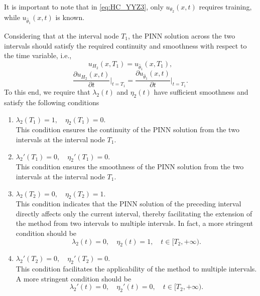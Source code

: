 \documentclass[preprint]{elsarticle}
\numberwithin{table}{section}
\numberwithin{equation}{section}
\numberwithin{figure}{section}
\begin{document}
\begin{CJK}{UTF8}{gbsn}
It is important to note that in \eqref{eq:HC_YYZ3}, only   $u_{\theta_2}(x,t)$ requires training, while $u_{\hat\theta_1}(x,t)$ is  known.

 
 
 Considering that at the interval node $T_1$,   the PINN solution across the two intervals  should satisfy the required continuity and smoothness with respect to the time variable, i.e.,
\begin{equation}\label{continus}
{u}_{H_2}(x,T_1) = {u}_{\hat\theta_1}(x,T_1),
\end{equation}
\begin{equation}\label{d_continus}
\frac{\partial u_{H_2}(x,t)}{\partial t} \bigg|_{t=T_1} = \frac{\partial u_{\hat\theta_1}(x,t)}{\partial t} \bigg|_{t=T_1}.
\end{equation}
To this end, we require that $\lambda_2(t)$ and $\eta_2(t)$ have sufficient smoothness and satisfy the following conditions 
\begin{enumerate}
    \item $\lambda_2(T_1)=1,\quad\eta_2(T_1) =0.$\\
    This condition ensures    the continuity of the PINN solution from the two intervals at the interval node   $T_1$.
 
    \item $\lambda_2'(T_1)=0,\quad \eta_2'(T_1)=0.$\\
    This condition ensures  the smoothness of the PINN solution from the two intervals at the interval node   $T_1$.
    
    \item $\lambda_2(T_2)=0,\quad\eta_2(T_2) =1$.\\
    This condition indicates that the PINN solution of the preceding interval directly affects only the current interval, thereby facilitating the extension 
 of the method from two intervals to multiple intervals. In fact, a more stringent condition should be
\begin{equation}\label{cond_yyz1}
       \lambda_2(t)=0,\quad\eta_2(t) =1, \quad t\in[T_2,+\infty).
    \end{equation}
    
    \item 
    $\lambda_2'(T_2) =0, \quad\eta_2'(T_2)=0.$\\
    This condition facilitates the  applicability of the method to multiple intervals. A more stringent condition should be  
\begin{equation}\label{cond_yyz2}
       \lambda_2'(t) =0, \quad\eta_2'(t)=0, \quad t\in[T_2,+\infty).
    \end{equation}
    

\end{enumerate}
\end{CJK}
\end{document}
